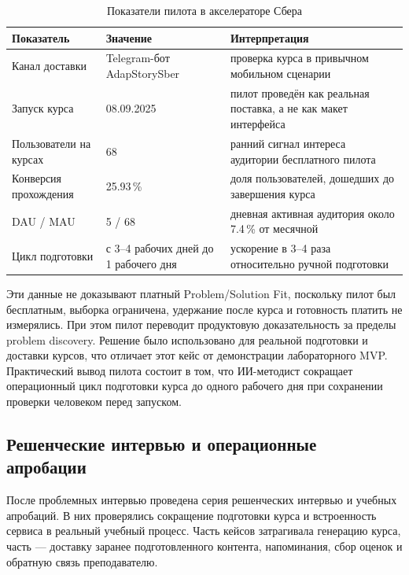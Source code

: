 \begin{table}[H]
  \centering
  \footnotesize
  \caption{Показатели пилота в акселераторе Сбера}
  \label{tab:sber-pilot}
  \begin{tabular}{|P{4.2cm}|P{4.1cm}|P{5.2cm}|}
  \hline
  \textbf{Показатель} & \textbf{Значение} & \textbf{Интерпретация} \\
  \hline
  Канал доставки & Telegram-бот AdapStorySber & проверка курса в привычном мобильном сценарии \\
  \hline
  Запуск курса & 08.09.2025 & пилот проведён как реальная поставка, а не как макет интерфейса \\
  \hline
  Пользователи на курсах & 68 & ранний сигнал интереса аудитории бесплатного пилота \\
  \hline
  Конверсия прохождения & 25.93\,\% & доля пользователей, дошедших до завершения курса \\
  \hline
  DAU / MAU & 5 / 68 & дневная активная аудитория около 7.4\,\% от месячной \\
  \hline
  Цикл подготовки & с 3–4 рабочих дней до 1 рабочего дня & ускорение в 3–4 раза относительно ручной подготовки \\
  \hline
  \end{tabular}
\end{table}

Эти данные не доказывают платный Problem/Solution Fit, поскольку пилот был бесплатным,
выборка ограничена, удержание после курса и готовность платить не измерялись.
При этом пилот переводит продуктовую доказательность за пределы problem
discovery. Решение было использовано для реальной подготовки и доставки
курсов, что отличает этот кейс от демонстрации лабораторного MVP.
Практический вывод
пилота состоит в том, что ИИ-методист сокращает операционный цикл подготовки
курса до одного рабочего дня при сохранении проверки человеком перед запуском.

\subsection{Решенческие интервью и операционные апробации}

После проблемных интервью проведена серия решенческих интервью и учебных
апробаций. В них проверялись сокращение подготовки курса и встроенность
сервиса в реальный учебный процесс. Часть кейсов
затрагивала генерацию курса, часть — доставку заранее подготовленного
контента, напоминания, сбор оценок и обратную связь преподавателю.

